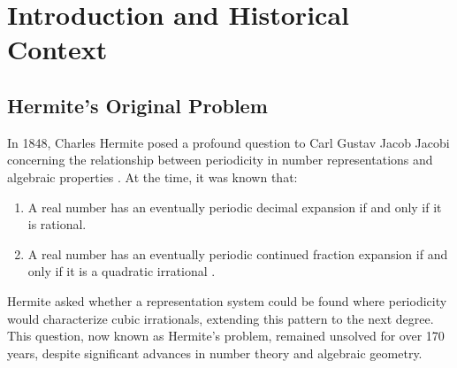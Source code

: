 \section{Introduction and Historical Context}

\subsection{Hermite's Original Problem}

In 1848, Charles Hermite posed a profound question to Carl Gustav Jacob Jacobi concerning the relationship between periodicity in number representations and algebraic properties \cite{Hermite1848}. At the time, it was known that:
\begin{enumerate}
    \item A real number has an eventually periodic decimal expansion if and only if it is rational.
    \item A real number has an eventually periodic continued fraction expansion if and only if it is a quadratic irrational \cite{Lagrange1770}.
\end{enumerate}

Hermite asked whether a representation system could be found where periodicity would characterize cubic irrationals, extending this pattern to the next degree. This question, now known as Hermite's problem, remained unsolved for over 170 years, despite significant advances in number theory and algebraic geometry.

